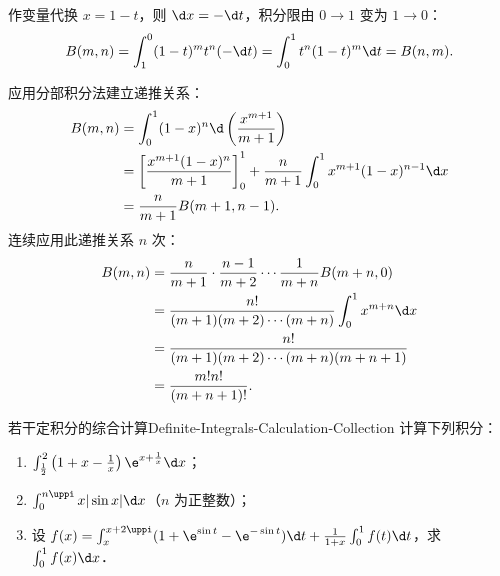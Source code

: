 \begin{myproof}

    作变量代换 $x = 1 - t$，则 $\d x = -\d t$，积分限由 $0 \to 1$ 变为 $1 \to 0$：
    \begin{equation}
        B(m, n) = \int_1^0 (1 - t)^m t^n (-\d t) = \int_0^1 t^n (1 - t)^m \d t = B(n, m).
    \end{equation}


    应用分部积分法建立递推关系：
    \begin{equation}
        \begin{aligned}
            B(m, n) & = \int_0^1 (1 - x)^n \d\left( \frac{x^{m+1}}{m+1} \right)                                            \\
                    & = \left[ \frac{x^{m+1}(1 - x)^n}{m+1} \right]_0^1 + \frac{n}{m+1} \int_0^1 x^{m+1}(1 - x)^{n-1} \d x \\
                    & = \frac{n}{m+1} B(m+1, n-1).
        \end{aligned}
    \end{equation}
    连续应用此递推关系 $n$ 次：
    \begin{equation}
        \begin{aligned}
            B(m, n) & = \frac{n}{m+1} \cdot \frac{n-1}{m+2} \cdots \frac{1}{m+n} B(m+n, 0) \\
                    & = \frac{n!}{(m+1)(m+2)\cdots(m+n)} \int_0^1 x^{m+n} \d x             \\
                    & = \frac{n!}{(m+1)(m+2)\cdots(m+n)(m+n+1)}                            \\
                    & = \frac{m!n!}{(m+n+1)!}.
        \end{aligned}
    \end{equation}
\end{myproof}

\begin{problem}{若干定积分的综合计算}{Definite-Integrals-Calculation-Collection}
    计算下列积分：
    \begin{enumerate}
        \item $\int_{\frac{1}{2}}^2 \left(1 + x - \frac{1}{x}\right) \e^{x + \frac{1}{x}} \d x$；
        \item $\int_0^{n\uppi} x |\sin x| \d x$（$n$ 为正整数）；
        \item 设 $f(x) = \int_x^{x+2\uppi}(1 + \e^{\sin t} - \e^{-\sin t})\d t + \frac{1}{1+x}\int_0^1 f(t)\d t$，求 $\int_0^1 f(x) \d x$．
    \end{enumerate}
\end{problem}

